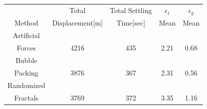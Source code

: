 \begin{center}
 \label{perf_multiple} 
\begin{tabular}{|c|c|c|c|c|}
					
\hline
 & Total  & Total Settling & \textbf{$\epsilon_t$} & \textbf{$\epsilon_g$} \\ Method & Displacement[m] & Time[sec]& Mean & Mean \\
\hline
Artificial&  &  &  & \\
 Forces & 4216 & 435& 2.21 & 0.68\\
 \hline
 Bubble&  &  &  & \\
 Packing &3876 &367 &2.31 & 0.56\\
\hline
 Randomized&  &  &  & \\
 Fractals &3769 &372 &3.35 & 1.16\\
\hline
\end{tabular}
\end{center}